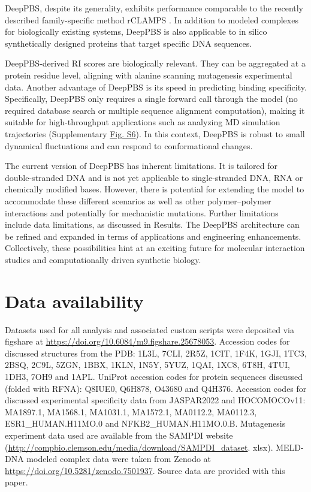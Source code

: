 \par
DeepPBS, despite its generality, exhibits performance comparable to the recently described family-specific method rCLAMPS \citep{Wetzel2022}. In addition to modeled complexes for biologically existing systems, DeepPBS is also applicable to in silico synthetically designed proteins that target specific DNA sequences.
\par
DeepPBS-derived RI scores are biologically relevant. They can be aggregated at a protein residue level, aligning with alanine scanning mutagenesis experimental data. Another advantage of DeepPBS is its speed in predicting binding specificity. Specifically, DeepPBS only requires a single forward call through the model (no required database search or multiple sequence alignment computation), making it suitable for high-throughput applications such as analyzing MD simulation trajectories (Supplementary \hyperref[fig:pdnaS6]{Fig. S6}). In this context, DeepPBS is robust to small dynamical fluctuations and can respond to conformational changes.
\par
{}
\par
The current version of DeepPBS has inherent limitations. It is tailored for double-stranded DNA and is not yet applicable to single-stranded DNA, RNA or chemically modified bases. However, there is potential for extending the model to accommodate these different scenarios as well as other polymer–polymer interactions and potentially for mechanistic mutations. Further limitations include data limitations, as discussed in Results. The DeepPBS architecture can be refined and expanded in terms of applications and engineering enhancements. Collectively, these possibilities hint at an exciting future for molecular interaction studies and computationally driven synthetic biology. 

\section{Data availability}
Datasets used for all analysis and associated custom scripts were deposited via figshare at \url{https://doi.org/10.6084/m9.figshare.25678053}. Accession codes for discussed structures from the PDB: 1L3L,
7CLI, 2R5Z, 1CIT, 1F4K, 1GJI, 1TC3, 2BSQ, 2C9L, 5ZGN, 1BBX, 1KLN,
1N5Y, 5YUZ, 1QAI, 1XC8, 6T8H, 4TUI, 1DH3, 7OH9 and 1APL. UniProt
accession codes for protein sequences discussed (folded with RFNA):
Q8IUE0, Q6H878, O43680 and Q4H376. Accession codes for discussed
experimental specificity data from JASPAR2022 and HOCOMOCOv11:
MA1897.1, MA1568.1, MA1031.1, MA1572.1, MA0112.2, MA0112.3,
ESR1\_HUMAN.H11MO.0 and NFKB2\_HUMAN.H11MO.0.B. Mutagenesis experiment data used are available from the SAMPDI website
(\url{http://compbio.clemson.edu/media/download/SAMPDI\_dataset}.
xlsx). MELD-DNA modeled complex data were taken from Zenodo
at \url{https://doi.org/10.5281/zenodo.7501937}. Source data are
provided with this paper.

